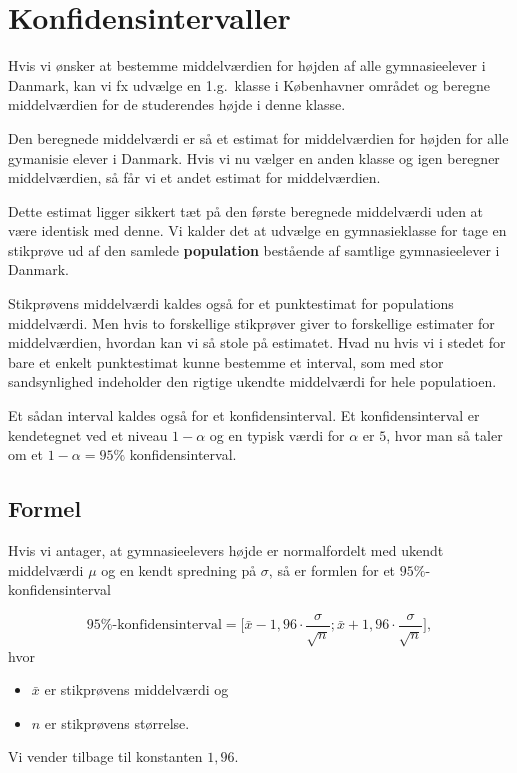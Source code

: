 
\section{Konfidensintervaller}
Hvis vi ønsker at bestemme middelværdien for højden af alle gymnasieelever i Danmark, kan vi fx udvælge en 1.g.\ klasse i Københavner området og beregne middelværdien for de studerendes højde i denne klasse.

Den beregnede middelværdi er så et estimat for middelværdien for højden for alle gymanisie elever i Danmark. Hvis vi nu vælger en anden klasse og igen beregner middelværdien, så får vi et andet estimat for middelværdien.

Dette estimat ligger sikkert tæt på den første beregnede middelværdi uden at være identisk med denne. Vi kalder det at udvælge en gymnasieklasse for tage en stikprøve ud af den samlede \textbf{population} bestående af samtlige gymnasieelever i Danmark.

Stikprøvens middelværdi kaldes også for et punktestimat for populations middelværdi. Men hvis to forskellige stikprøver giver to forskellige estimater for middelværdien, hvordan kan vi så stole på estimatet. Hvad nu hvis vi i stedet for bare et enkelt punktestimat kunne bestemme et interval, som med stor sandsynlighed indeholder den rigtige ukendte middelværdi for hele populatioen.

Et sådan interval kaldes også for et konfidensinterval. Et konfidensinterval er kendetegnet ved et niveau \(1 - \alpha\) og en typisk værdi for \(\alpha\) er \(5\), hvor man så taler om et \(1-\alpha = 95\%\) konfidensinterval.

\subsection{Formel}
Hvis vi antager, at gymnasieelevers højde er normalfordelt med ukendt middelværdi \(\mu\) og en kendt spredning på \(\sigma\), så er formlen for et \(95\%\)-konfidens\-interval

\begin{equation}
  95\%\mbox{-konfidensinterval} = \Big[\bar{x} - 1,96⋅\frac{\sigma}{\sqrt{n}};
  \bar{x} +1,96⋅\frac{\sigma}{\sqrt{n}} \Big],
\end{equation}
hvor
\begin{itemize}
  \item \(\bar{x}\) er stikprøvens middelværdi og
  \item \(n\) er stikprøvens størrelse.
\end{itemize}
Vi vender tilbage til konstanten \(1,96\).

